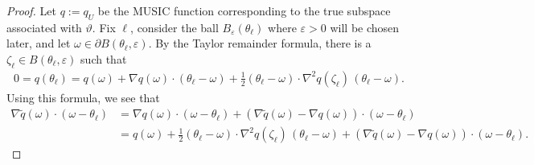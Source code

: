 \documentclass[11pt]{article}
\theoremstyle{definition}
\numberwithin{theorem}{section}
\numberwithin{lemma}{section}
\numberwithin{equation}{section}
\renewcommand{\tilde}{\widetilde}
\renewcommand{\epsilon}{\varepsilon}
\numberwithin{equation}{section}
\begin{document}
	\begin{proof}
		Let $q:=q_U$ be the MUSIC function corresponding to the true subspace associated with $\vartheta$. Fix $\ell$, consider the ball $B_\epsilon(\theta_\ell)$ where $\epsilon >0$ will be chosen later, and let $\omega\in \partial B(\theta_\ell,\epsilon)$. By the Taylor remainder formula, there is a $\zeta_\ell\in B(\theta_\ell,\epsilon)$ such that  
		\begin{align*}
			0 = q(\theta_\ell)=q(\omega)+ \nabla q(\omega) \cdot (\theta_\ell-\omega) + \frac 12 (\theta_\ell-\omega) \cdot \nabla^2 q(\zeta_\ell) \, (\theta_\ell-\omega). 
		\end{align*}
		Using this formula, we see that
		\begin{align*}
			\nabla \tilde q(\omega) \cdot (\omega-\theta_\ell) 
			&= \nabla q(\omega) \cdot (\omega-\theta_\ell) + (\nabla \tilde q(\omega)-\nabla q(\omega)) \cdot (\omega-\theta_\ell) \\
			&= q(\omega) + \frac 12 (\theta_\ell-\omega) \cdot \nabla^2 q(\zeta_\ell) \, (\theta_\ell-\omega) + (\nabla \tilde q(\omega)-\nabla q(\omega)) \cdot (\omega-\theta_\ell). 
		\end{align*}
		

\end{proof}
\end{document}
